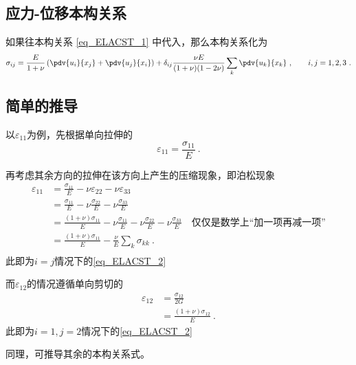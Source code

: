 \subsection{应力-位移本构关系}
如果往本构关系 \autoref{eq_ELACST_1} 中代入，那么本构关系化为
\begin{equation}
\sigma_{ij}=\frac{E}{1+\nu}\left(\pdv{u_i}{x_j}+\pdv{u_j}{x_i}\right)
+\delta_{ij}\frac{\nu E}{(1+\nu)(1-2\nu)}\sum_k\pdv{u_k}{x_k}~,\qquad i,j=1,2,3~.
\end{equation}

\subsection{简单的推导}
以$\varepsilon_{11}$为例，先根据单向拉伸的
$$\varepsilon_{11} = \frac{\sigma_{11}}{E}~.$$

再考虑其余方向的拉伸在该方向上产生的压缩现象，即泊松现象
$$
\begin{aligned}
\varepsilon_{11} &= \frac{\sigma_{11}}{E} - \nu \varepsilon_{22}  - \nu \varepsilon_{33}\\
&=\frac{\sigma_{11}}{E} - \nu\frac{\sigma_{22}}{E} - \nu\frac{\sigma_{33}}{E}\\
&=\frac{(1+\nu)\sigma_{11}}{E} - \nu\frac{\sigma_{11}}{E}  - \nu\frac{\sigma_{22}}{E} - \nu\frac{\sigma_{33}}{E} \quad \text{仅仅是数学上“加一项再减一项”}\\
&=\frac{(1+\nu)\sigma_{11}}{E} - \frac{\nu}{E}\sum_k \sigma_{kk} ~.\\
\end{aligned}
$$
此即为$i=j$情况下的\autoref{eq_ELACST_2} 

而$\varepsilon_{12}$的情况遵循单向剪切的
$$
\begin{aligned}
\varepsilon_{12} &= \frac{\sigma_{12}}{2G}\\
&=\frac{(1+\nu)\sigma_{12}}{E}~.
\end{aligned}
$$
此即为$i=1, j=2$情况下的\autoref{eq_ELACST_2} 

同理，可推导其余的本构关系式。
